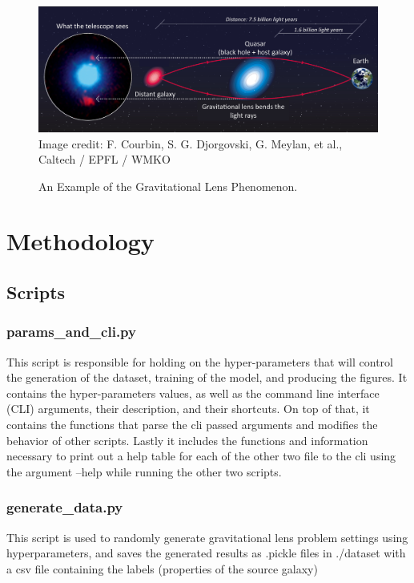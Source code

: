 \documentclass[12pt]{article}
\begin{document}
\begin{figure}[thb]
    \centering
    \includegraphics[width=\textwidth]{grav_lens.jpeg}
    Image credit: F. Courbin, S. G. Djorgovski, G. Meylan, et al., Caltech / EPFL / WMKO
    \caption{An Example of the Gravitational Lens Phenomenon.}
    \label{fig:grav}
\end{figure}


\section{Methodology}
\subsection{Scripts}
\subsubsection{params\_and\_cli.py}
This script is responsible for holding on the hyper-parameters that will control the generation of the dataset, training of the model, and producing the figures.
\newline\newline
It contains the hyper-parameters values, as well as the command line interface (CLI) arguments, their description, and their shortcuts. On top of that, it contains the functions that parse the cli passed arguments and modifies the behavior of other scripts. Lastly it includes the functions and information necessary to print out a help table for each of the other two file to the cli using the argument --help while running the other two scripts.

\subsubsection{generate\_data.py}
This script is used to randomly generate gravitational lens problem settings using hyperparameters, and saves the generated results as .pickle files in ./dataset with a csv file containing the labels (properties of the source
galaxy)
\end{document}
